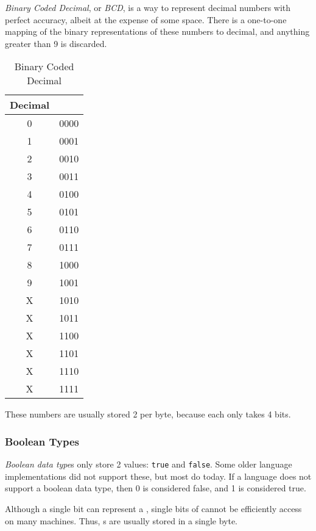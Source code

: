 \begin{definition}\label{def:Binary_Coded_Decimal}
  \emph{Binary Coded Decimal}, or \emph{BCD}, is a way to represent decimal numbers with perfect accuracy, albeit at the expense of some space.
  There is a one-to-one mapping of the binary representations of these numbers to decimal, and anything greater than 9 is discarded.
  \begin{table}[h!]
    \centering
    \begin{tabular}{cc}
      \toprule
      Decimal & \nameref{def:Binary_Coded_Decimal} \\
      \midrule
      0 & 0000 \\
      1 & 0001 \\
      2 & 0010 \\
      3 & 0011 \\
      4 & 0100 \\
      5 & 0101 \\
      6 & 0110 \\
      7 & 0111 \\
      8 & 1000 \\
      9 & 1001 \\
      \midrule
      X & 1010 \\
      X & 1011 \\
      X & 1100 \\
      X & 1101 \\
      X & 1110 \\
      X & 1111 \\
      \bottomrule
    \end{tabular}
    \caption{Binary Coded Decimal}
    \label{tab:Binary_Coded_Decimal}
  \end{table}

  \begin{remark}
    These numbers are usually stored 2 per byte, because each only takes 4 bits.
  \end{remark}
\end{definition}

\subsubsection{Boolean Types}\label{subsubsec:Boolean_Primitive_Data_Types}
\begin{definition}\label{def:Boolean_Data_Type}
  \emph{Boolean data type}s only store 2 values: \texttt{true} and \texttt{false}.
  Some older language implementations did not support these, but most do today.
  If a language does not support a boolean data type, then 0 is considered false, and 1 is considered true.

  \begin{remark}\label{rmk:Boolean_Storage_in_Memory}
    Although a single bit can represent a , single bits of  cannot be efficiently access on many machines.
    Thus, s are usually stored in a single byte.
  \end{remark}
\end{definition}

